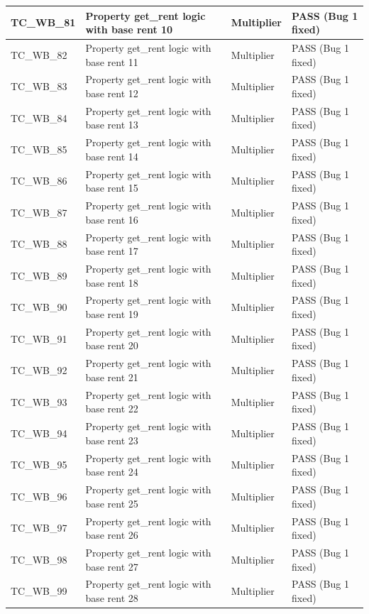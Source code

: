 \documentclass{article}
\begin{document}
\begin{longtable}{|p{2cm}|p{8cm}|p{3cm}|p{2cm}|}
\hline
TC\_WB\_81 & Property get\_rent logic with base rent 10 & Multiplier & PASS (Bug 1 fixed) \\
\hline
TC\_WB\_82 & Property get\_rent logic with base rent 11 & Multiplier & PASS (Bug 1 fixed) \\
\hline
TC\_WB\_83 & Property get\_rent logic with base rent 12 & Multiplier & PASS (Bug 1 fixed) \\
\hline
TC\_WB\_84 & Property get\_rent logic with base rent 13 & Multiplier & PASS (Bug 1 fixed) \\
\hline
TC\_WB\_85 & Property get\_rent logic with base rent 14 & Multiplier & PASS (Bug 1 fixed) \\
\hline
TC\_WB\_86 & Property get\_rent logic with base rent 15 & Multiplier & PASS (Bug 1 fixed) \\
\hline
TC\_WB\_87 & Property get\_rent logic with base rent 16 & Multiplier & PASS (Bug 1 fixed) \\
\hline
TC\_WB\_88 & Property get\_rent logic with base rent 17 & Multiplier & PASS (Bug 1 fixed) \\
\hline
TC\_WB\_89 & Property get\_rent logic with base rent 18 & Multiplier & PASS (Bug 1 fixed) \\
\hline
TC\_WB\_90 & Property get\_rent logic with base rent 19 & Multiplier & PASS (Bug 1 fixed) \\
\hline
TC\_WB\_91 & Property get\_rent logic with base rent 20 & Multiplier & PASS (Bug 1 fixed) \\
\hline
TC\_WB\_92 & Property get\_rent logic with base rent 21 & Multiplier & PASS (Bug 1 fixed) \\
\hline
TC\_WB\_93 & Property get\_rent logic with base rent 22 & Multiplier & PASS (Bug 1 fixed) \\
\hline
TC\_WB\_94 & Property get\_rent logic with base rent 23 & Multiplier & PASS (Bug 1 fixed) \\
\hline
TC\_WB\_95 & Property get\_rent logic with base rent 24 & Multiplier & PASS (Bug 1 fixed) \\
\hline
TC\_WB\_96 & Property get\_rent logic with base rent 25 & Multiplier & PASS (Bug 1 fixed) \\
\hline
TC\_WB\_97 & Property get\_rent logic with base rent 26 & Multiplier & PASS (Bug 1 fixed) \\
\hline
TC\_WB\_98 & Property get\_rent logic with base rent 27 & Multiplier & PASS (Bug 1 fixed) \\
\hline
TC\_WB\_99 & Property get\_rent logic with base rent 28 & Multiplier & PASS (Bug 1 fixed) \\

\end{longtable}
\end{document}
